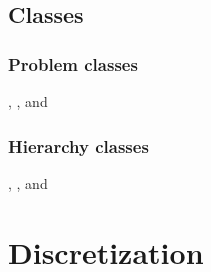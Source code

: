\documentclass[10pt]{article}
\begin{document}
\subsubsection{}

\subsubsection{}

\subsection{Classes} \label{ss:classes}

\subsubsection{Problem classes}

, , and 

\subsubsection{Hierarchy classes}

, , and 

\section{Discretization} \label{s:discretization}

\newcommand{\indvar}{r}
 \newcommand{\uc}{u(\indvar)}

 \newcommand{\uxp}{u(\indvar+h_x)}
 \newcommand{\uxm}{u(\indvar-h_x)}
 \newcommand{\uxph}{u(\indvar+\frac{h_x}{2})}
 \newcommand{\uxmh}{u(\indvar-\frac{h_x}{2})}

 \newcommand{\uyp}{u(\indvar+h_y)}
 \newcommand{\uym}{u(\indvar-h_y)}
 \newcommand{\uyph}{u(\indvar+\frac{h_y}{2})}
 \newcommand{\uymh}{u(\indvar-\frac{h_y}{2})}
\end{document}
